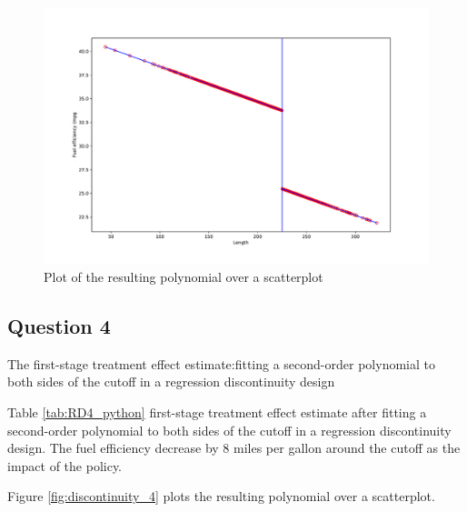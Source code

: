 \documentclass{article}
\begin{document}
\begin{figure}[ht]
    \centering
    \includegraphics[scale = 0.6]{discontinuity_31.pdf}
    \caption{Plot of the resulting polynomial over a scatterplot}
    \label{fig:discontinuity_31}
\end{figure}

\newpage

\subsection{Question 4 }

\begin{table}[ht]
    \centering
    
    \caption{The first-stage treatment effect estimate:fitting a second-order polynomial to both sides of the cutoff in a regression discontinuity design}
    \label{tab:RD4_python}
\end{table}

Table \ref{tab:RD4_python} first-stage treatment effect estimate after fitting a second-order polynomial to both sides of the cutoff in a regression discontinuity design. The fuel efficiency decrease by 8 miles per gallon around the cutoff as the impact of the policy.

Figure \ref{fig:discontinuity_4}  plots the resulting polynomial over a scatterplot.
\end{document}
